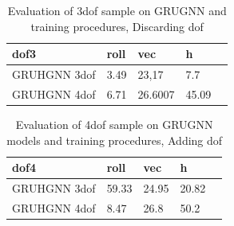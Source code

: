\begin{table}[h!]
\centering
\caption{Evaluation of 3dof sample on GRUGNN and training procedures, Discarding dof} %
\label{tab:my_label}               %
\begin{tabular}{|l|l|l|l|l|}
	\hline
	dof3 & roll & vec & h\\ 
	\hline
	GRUHGNN 3dof & 3.49 & 23,17 & 7.7 \\  
	\hline
	GRUHGNN 4dof & 6.71 & 26.6007 & 45.09 \\  
	\hline
\end{tabular}
\end{table}



\begin{table}[h!]
\centering
\caption{Evaluation of 4dof sample on GRUGNN models and training procedures, Adding dof} %
\label{tab:my_label}               %
\begin{tabular}{|l|l|l|l|l|}
	\hline
	dof4 & roll & vec & h\\  
	\hline
	GRUHGNN 3dof & 59.33 & 24.95 & 20.82 \\  
	\hline
	GRUHGNN 4dof & 8.47 & 26.8 & 50.2 \\  
	\hline
\end{tabular}
\end{table}

